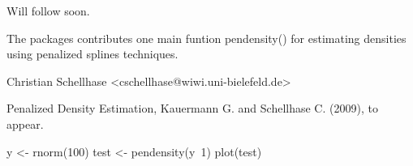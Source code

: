 \begin{Description}\relax
Will follow soon.
\end{Description}
\begin{Details}\relax
{}
The packages contributes one main funtion {\ttfamily pendensity()} for estimating densities using penalized splines techniques.
\end{Details}
\begin{Author}\relax
Christian Schellhase <cschellhase@wiwi.uni-bielefeld.de>
\end{Author}
\begin{References}\relax
Penalized Density Estimation, Kauermann G. and Schellhase C. (2009), to appear.
\end{References}
\begin{Examples}
\begin{ExampleCode}
y <- rnorm(100)
test <- pendensity(y~1)
plot(test)

\end{ExampleCode}
\end{Examples}

